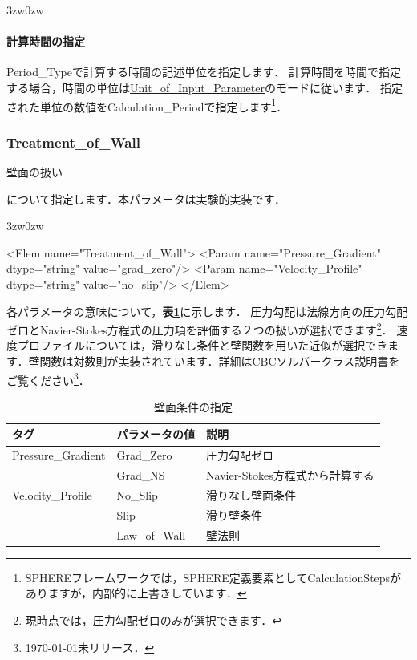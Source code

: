 \begin{indentation}{3zw}{0zw}
%
\pagebreak
\paragraph{計算時間の指定}
Period\_Typeで計算する時間の記述単位を指定します．
計算時間を時間で指定する場合，時間の単位は\hyperlink{tgt:unit}{Unit\_of\_Input\_Parameter}のモードに従います．
指定された単位の数値をCalculation\_Periodで指定します\footnote{SPHEREフレームワークでは，SPHERE定義要素としてCalculationStepsがありますが，内部的に上書きしています．}．

\end{indentation}



\pagebreak
\subsubsection{Treatment\_of\_Wall}

\hypertarget{tgt:treatment_of_wall}{壁面の扱い}について指定します．本パラメータは実験的実装です．

\begin{indentation}{3zw}{0zw}

{\small
\begin{program}
<Elem name="Treatment_of_Wall">
  <Param name="Pressure_Gradient" dtype="string" value="grad_zero"/>
  <Param name="Velocity_Profile"  dtype="string" value="no_slip"/>
</Elem>
\end{program}
}

各パラメータの意味について，\textbf{表\ref{tbl:wall_treatment}}に示します．
圧力勾配は法線方向の圧力勾配ゼロとNavier-Stokes方程式の圧力項を評価する２つの扱いが選択できます\footnote{現時点では，圧力勾配ゼロのみが選択できます．}．
速度プロファイルについては，滑りなし条件と壁関数を用いた近似が選択できます．壁関数は対数則が実装されています．詳細はCBCソルバークラス説明書をご覧ください\footnote{\today 未リリース．}．

\begin{table}[htdp]
\caption{壁面条件の指定}
\begin{center}
\small
\begin{tabular}{lll} \toprule
タグ & パラメータの値 & 説明\\ \midrule
Pressure\_Gradient & Grad\_Zero & 圧力勾配ゼロ\\
 & Grad\_NS & Navier-Stokes方程式から計算する\\ \hline
Velocity\_Profile  & No\_Slip & 滑りなし壁面条件\\
 & Slip & 滑り壁条件\\
 & Law\_of\_Wall & 壁法則\\ \bottomrule
\end{tabular}
\end{center}
\label{tbl:wall_treatment}
\end{table}

\end{indentation}


